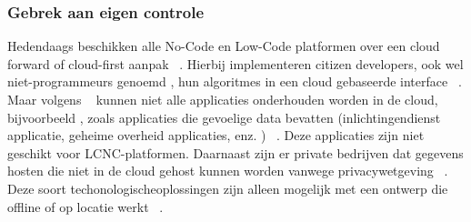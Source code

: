 \subsubsection*{Gebrek aan eigen controle}
\label{subsec:gebrek-aan-eigen-controle}
Hedendaags beschikken alle No-Code en Low-Code platformen over een cloud forward of cloud-first aanpak ~\autocite{Sufi_2023}. 
Hierbij implementeren citizen developers, ook wel niet-programmeurs genoemd , hun algoritmes in een cloud gebaseerde interface ~\autocite{Sufi_2023}. 
Maar volgens ~\textcite{Sufi_2023} kunnen niet alle applicaties onderhouden worden in de cloud, bijvoorbeeld , zoals applicaties die gevoelige data bevatten 
(inlichtingendienst applicatie, geheime overheid applicaties, enz. ) ~\autocite{Sufi_2023}. Deze applicaties zijn niet geschikt voor LCNC-platformen. 
Daarnaast zijn er private bedrijven dat gegevens hosten die niet in de cloud gehost kunnen worden vanwege privacywetgeving ~\autocite{Sufi_2023}. 
Deze soort techonologischeoplossingen zijn alleen mogelijk met een ontwerp die offline of op locatie werkt ~\autocite{Sufi_2023}.
